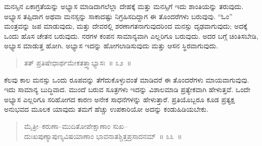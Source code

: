 \vspace{-0.3cm}


\vspace{0.3cm}

ಮನಸ್ಸಿನ ಏಕಾಗ್ರತೆಯನ್ನು ಅಭ್ಯಾಸ ಮಾಡಿದಾಗಲೆಲ್ಲಾ ದೇಹಕ್ಕೆ ಮತ್ತು ಮನಸ್ಸಿಗೆ ಇದು ಶಾಂತಿಯನ್ನು ತರುವುದು. ಅಭ್ಯಾಸ ತಪ್ಪಿದಾಗ ಅಥವಾ ಮನಸ್ಸನ್ನು ಸಾಕಾದಷ್ಟು ನಿಗ್ರಹಿಸದಿದ್ದಾಗ ಈ ತೊಂದರೆಗಳು ಬರುವುವು. “ಓಂ” ಮಂತ್ರವನ್ನು ಜಪ ಮಾಡುವುದು, ಮತ್ತು ದೇವರಲ್ಲಿ ಶರಣಾಗತನಾಗುವುದರಿಂದ ಮನಸ್ಸು ದೃಢವಾಗುವುದು; ಅದಕ್ಕೆ ಒಂದು ಹೊಸ ಚೇತನ ಬರುವುದು. ನರಗಳ ಕಂಪನ ಸಾಮಾನ್ಯವಾಗಿ ಎಲ್ಲರಿಗೂ ಬರುವುದು. ಅದರ ಬಗ್ಗೆ ಚಿಂತಿಸಬೇಡಿ, ಅಭ್ಯಾಸ ಮಾಡುತ್ತ ಹೋಗಿ. ಅಭ್ಯಾಸ ಇದನ್ನು ಹೋಗಲಾಡಿಸುವುದು ಮತ್ತು ಆಸನ ಸ್ಥಿರವಾಗುವುದು. 


\begin{verse}
ತತ್​ ಪ್ರತಿಷೇಧಾರ್ಥಮೇಕತತ್ತ್ವಾಭ್ಯಾಸಃ~॥ ೩೨~॥
\end{verse}

\vspace{-0.33cm}


\eject

ಕೆಲವು ಕಾಲ ಮನಸ್ಸು ಒಂದು ರೂಪವನ್ನು ತೆಗೆದುಕೊಳ್ಳುವಂತೆ ಮಾಡಿದರೆ ಈ ತೊಂದರೆಗಳು ಮಾಯವಾಗುವುವು. ಇದು ಸಾಮಾನ್ಯ ಬುದ್ಧಿವಾದ. ಮುಂದೆ ಬರುವ ಸೂತ್ರಗಳು ಇದನ್ನು ವಿಶಾಲಮಾಡಿ ಪ್ರತ್ಯೇಕವಾಗಿ ಹೇಳುತ್ತವೆ. ಒಂದೇ ಅಭ್ಯಾಸ ಎಲ್ಲರಿಗೂ ಸರಿಹೋಗದ ಕಾರಣ ಅನೇಕ ಸಾಧನೆಗಳನ್ನು ಹೇಳುತ್ತಾರೆ. ಪ್ರತಿಯೊಬ್ಬರೂ ಕೂಡ ಪ್ರತ್ಯಕ್ಷ ಅನುಭವದ ಮೂಲಕ ಯಾವುದು ತಮಗೆ ಹೆಚ್ಚು ಉಪಕಾರಿಯೋ ಅದನ್ನು ಕಂಡುಹಿಡಿಯಬೇಕು. 

\vspace{-0.1cm}

\begin{verse}
ಮೈತ್ರೀ–ಕರುಣಾ–ಮುದಿತೋಪೇಕ್ಷಾಣಾಂ ಸುಖ–\\ದುಃಖಪುಣ್ಯಾಪುಣ್ಯವಿಷಯಾಣಾಂ ಭಾವನಾತಶ್ಚಿತ್ತಪ್ರಸಾದನಮ್​~॥ ೩೩~॥
\end{verse}

\vspace{-0.4cm}


\vskip 0.2cm

